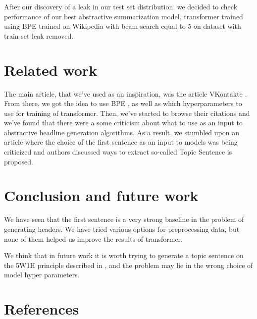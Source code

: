 \documentclass{dialogue}
\begin{document}
After our discovery of a leak in our test set distribution, we decided to check performance of our best abstractive summarization model, transformer trained using BPE trained on Wikipedia with beam search equal to 5 on dataset with train set leak removed.

\section{Related work}
The main article, that we've used as an inspiration, was the article VKontakte \cite{gavrilov2018self}. From there, we got the idea to use BPE \cite{DBLP:journals/corr/SennrichHB15}, as well as which hyperparameters to use for training of transformer. Then, we've started to browse their citations and we've found that there were a some criticism about what to use as an input to abstractive headline generation algorithms. As a result, we stumbled upon an article where the choice of the first sentence as an input to models was being criticized and authors discussed ways to extract so-called Topic Sentence \cite{Putra2018IncorporatingTS} is proposed.

\section{Conclusion and future work}
We have seen that the first sentence is a very strong baseline in the problem of generating headers. We have tried various options for preprocessing data, but none of them helped us improve the results of transformer.

We think that in future work it is worth trying to generate a topic sentence on the 5W1H principle described in \cite{Putra2018IncorporatingTS}, and the problem may lie in the wrong choice of model hyper parameters.


\color{blue}\section*{References}

\makeatletter
\renewcommand{\section}{\@gobbletwo}
\makeatother

\end{document}
